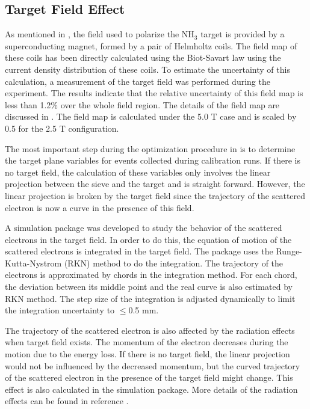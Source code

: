 \subsection{Target Field Effect}
\label{C6S2SS3}

As mentioned in , the field used to polarize the NH${}_3$ target is provided by a superconducting magnet, formed by a pair of Helmholtz coils. The field map of these coils has been directly calculated using the Biot-Savart law using the current density distribution of these coils. To estimate the uncertainty of this calculation, a measurement of the target field was performed during the experiment. The results indicate that the relative uncertainty of this field map is less than 1.2\% over the whole field region. The details of the field map are discussed in . The field map is calculated under the 5.0 T case and is scaled by 0.5 for the 2.5 T configuration.

The most important step during the optimization procedure in  is to determine the target plane variables for events collected during calibration runs. If there is no target field, the calculation of these variables only involves the linear projection between the sieve and the target and is straight forward. However, the linear projection is broken by the target field since the trajectory of the scattered electron is now a curve in the presence of this field.

A simulation package was developed to study the behavior of the scattered electrons in the target field. In order to do this, the equation of motion of the scattered electrons is integrated in the target field. The package uses the Runge-Kutta-Nystrom (RKN) method to do the integration. The trajectory of the electrons is approximated by chords in the integration method. For each chord, the deviation between its middle point and the real curve is also estimated by RKN method. The step size of the integration is adjusted dynamically to limit the integration uncertainty to $\leq$0.5 mm.

The trajectory of the scattered electron is also affected by the radiation effects when target field exists. The momentum of the electron decreases during the motion due to the energy loss. If there is no target field, the linear projection would not be influenced by the decreased momentum, but the curved trajectory of the scattered electron in the presence of the target field might change. This effect is also calculated in the simulation package. More details of the radiation effects can be found in reference \cite{Liu2015}.


